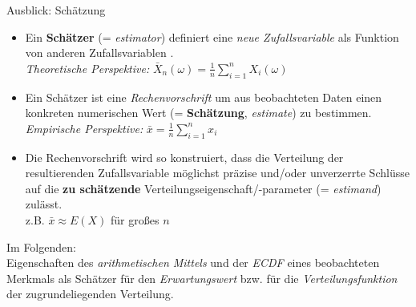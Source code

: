 \documentclass[
  10pt,
  ignorenonframetext,
]{beamer}
\begin{document}
\begin{frame}{Ausblick: Schätzung}
\label{ausblick-schuxe4tzung-1}
\begin{itemize}
\item
  Ein \textbf{Schätzer} (= \emph{estimator}) definiert eine \emph{neue
  Zufallsvariable} als Funktion von anderen Zufallsvariablen .\\
  \emph{Theoretische Perspektive:}
  \(\bar X_n(\omega) = \tfrac{1}{n} \sum^n_{i=1} X_i(\omega)\)
\item
  Ein Schätzer ist eine \emph{Rechenvorschrift} um aus beobachteten
  Daten einen konkreten numerischen Wert (= \textbf{Schätzung},
  \emph{estimate}) zu bestimmen.\\
  \emph{Empirische Perspektive:}
  \(\bar x = \tfrac{1}{n} \sum^n_{i=1} x_i\)
\item
  Die Rechenvorschrift wird so konstruiert, dass die Verteilung der
  resultierenden Zufallsvariable möglichst präzise und/oder unverzerrte
  Schlüsse auf die \textbf{zu schätzende}
  Verteilungseigenschaft/-parameter (= \emph{estimand}) zulässt.\\
  z.B. \(\bar x \approx E(X)\) für großes \(n\)
\end{itemize}

Im Folgenden:\\
Eigenschaften des \emph{arithmetischen Mittels} und der \emph{ECDF}
eines beobachteten Merkmals als Schätzer für den \emph{Erwartungswert}
bzw. für die \emph{Verteilungsfunktion} der zugrundeliegenden
Verteilung.
\end{frame}
\end{document}
